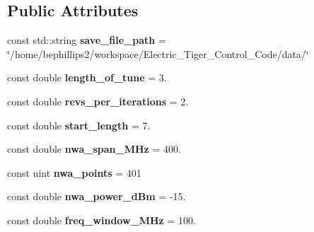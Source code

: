 \subsection*{Public Attributes}
\begin{DoxyCompactItemize}
\item 
const std\+::string {\bfseries save\+\_\+file\+\_\+path} = \char`\"{}/home/bephillips2/workspace/Electric\+\_\+\+Tiger\+\_\+\+Control\+\_\+\+Code/data/\char`\"{}\hypertarget{class_experiment_parameters_a1cfe3a5d3b3bffce5c0b890f35d7d7ba}{}\label{class_experiment_parameters_a1cfe3a5d3b3bffce5c0b890f35d7d7ba}

\item 
const double {\bfseries length\+\_\+of\+\_\+tune} = 3.\hypertarget{class_experiment_parameters_ace5c189c9e18f1137e875a6487e8fd1a}{}\label{class_experiment_parameters_ace5c189c9e18f1137e875a6487e8fd1a}

\item 
const double {\bfseries revs\+\_\+per\+\_\+iterations} = 2.\hypertarget{class_experiment_parameters_ae6b8acdaee713344727231fe90cda43e}{}\label{class_experiment_parameters_ae6b8acdaee713344727231fe90cda43e}

\item 
const double {\bfseries start\+\_\+length} = 7.\hypertarget{class_experiment_parameters_ae1ad144064c4d84a0356262a66f6762e}{}\label{class_experiment_parameters_ae1ad144064c4d84a0356262a66f6762e}

\item 
const double {\bfseries nwa\+\_\+span\+\_\+\+M\+Hz} = 400.\hypertarget{class_experiment_parameters_ae6c893bbe23d5fa066b22a1eff53a7c0}{}\label{class_experiment_parameters_ae6c893bbe23d5fa066b22a1eff53a7c0}

\item 
const uint {\bfseries nwa\+\_\+points} = 401\hypertarget{class_experiment_parameters_a32013416c5253fb5e9a6dc1b6c18b0a1}{}\label{class_experiment_parameters_a32013416c5253fb5e9a6dc1b6c18b0a1}

\item 
const double {\bfseries nwa\+\_\+power\+\_\+d\+Bm} = -\/15.\hypertarget{class_experiment_parameters_ab16b546dab57c7077152a97053a041d0}{}\label{class_experiment_parameters_ab16b546dab57c7077152a97053a041d0}

\item 
const double {\bfseries freq\+\_\+window\+\_\+\+M\+Hz} = 100.\hypertarget{class_experiment_parameters_a1d495d1cadd1cb8f3221d1adc7a2e92e}{}\label{class_experiment_parameters_a1d495d1cadd1cb8f3221d1adc7a2e92e}


\end{DoxyCompactItemize}

